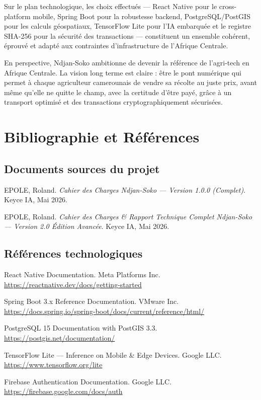 \documentclass[12pt,a4paper]{report}
\begin{document}
Sur le plan technologique, les choix effectués — React Native pour le cross-platform mobile, Spring Boot pour la robustesse backend, PostgreSQL/PostGIS pour les calculs géospatiaux, TensorFlow Lite pour l'IA embarquée et le registre SHA-256 pour la sécurité des transactions — constituent un ensemble cohérent, éprouvé et adapté aux contraintes d'infrastructure de l'Afrique Centrale.

En perspective, Ndjan-Soko ambitionne de devenir la référence de l'agri-tech en Afrique Centrale. La vision long terme est claire : être le pont numérique qui permet à chaque agriculteur camerounais de vendre sa récolte au juste prix, avant même qu'elle ne quitte le champ, avec la certitude d'être payé, grâce à un transport optimisé et des transactions cryptographiquement sécurisées.

\chapter*{Bibliographie et Références}

\section*{Documents sources du projet}

\begin{enumerate}[label={[\arabic*]}]
  \item EPOLE, Roland. \textit{Cahier des Charges Ndjan-Soko — Version 1.0.0 (Complet)}. Keyce IA, Mai 2026.
  \item EPOLE, Roland. \textit{Cahier des Charges \& Rapport Technique Complet Ndjan-Soko — Version 2.0 Édition Avancée}. Keyce IA, Mai 2026.
\end{enumerate}

\section*{Références technologiques}

\begin{enumerate}[label={[\arabic*]}, start=3]
  \item React Native Documentation. Meta Platforms Inc. \url{https://reactnative.dev/docs/getting-started}
  \item Spring Boot 3.x Reference Documentation. VMware Inc. \url{https://docs.spring.io/spring-boot/docs/current/reference/html/}
  \item PostgreSQL 15 Documentation with PostGIS 3.3. \url{https://postgis.net/documentation/}
  \item TensorFlow Lite — Inference on Mobile \& Edge Devices. Google LLC. \url{https://www.tensorflow.org/lite}
  \item Firebase Authentication Documentation. Google LLC. \url{https://firebase.google.com/docs/auth}
\end{enumerate}
\end{document}
